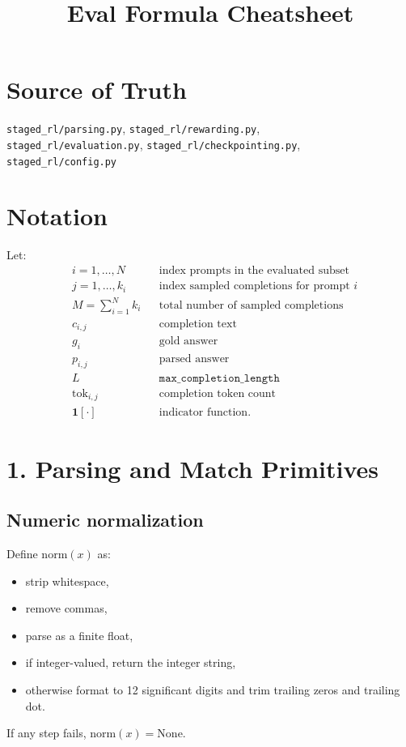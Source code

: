 \documentclass[11pt]{article}
\newcommand{\ind}{\mathbf{1}}
\newcommand{\None}{\mathrm{None}}
\begin{document}
\title{Eval Formula Cheatsheet}
\author{}
\date{}
\maketitle

\section*{Source of Truth}
\texttt{staged\_rl/parsing.py}, \texttt{staged\_rl/rewarding.py}, \\
\texttt{staged\_rl/evaluation.py}, \texttt{staged\_rl/checkpointing.py}, \\
\texttt{staged\_rl/config.py}

\section*{Notation}
Let:
\begin{align*}
&i = 1,\dots,N && \text{index prompts in the evaluated subset} \\
&j = 1,\dots,k_i && \text{index sampled completions for prompt } i \\
&M = \sum_{i=1}^{N} k_i && \text{total number of sampled completions} \\
&c_{i,j} && \text{completion text} \\
&g_i && \text{gold answer} \\
&p_{i,j} && \text{parsed answer} \\
&L && \texttt{max\_completion\_length} \\
&\mathrm{tok}_{i,j} && \text{completion token count} \\
&\ind[\cdot] && \text{indicator function.}
\end{align*}

\section*{1. Parsing and Match Primitives}

\subsection*{Numeric normalization}
Define $\mathrm{norm}(x)$ as:
\begin{itemize}
\item strip whitespace,
\item remove commas,
\item parse as a finite float,
\item if integer-valued, return the integer string,
\item otherwise format to 12 significant digits and trim trailing zeros and trailing dot.
\end{itemize}
If any step fails, $\mathrm{norm}(x)=\None$.
\end{document}
